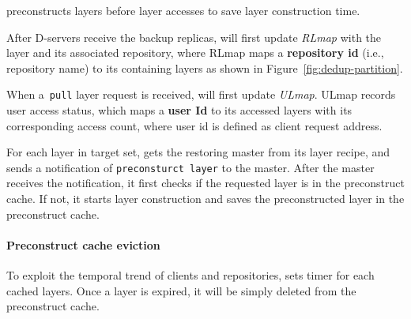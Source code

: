 \sysname preconstructs layers before layer accesses to save layer construction time.

After D-servers receive the backup replicas,
\sysname will first update \emph{RLmap} with the layer and its associated repository, where
RLmap maps a \textbf{repository id} (i.e., repository name) to its containing layers 
as shown in Figure~\ref{fig:dedup-partition}.

When a~\texttt{pull} layer request is received, 
\sysname will first update \emph{ULmap}. 
ULmap records user access status,
which maps a \textbf{user Id} to its accessed layers with its corresponding access count,
where user id is defined as client request address.

For each layer in target set, 
\sysname gets the restoring master from its layer recipe,
and sends a notification of \texttt{preconsturct layer} to the master.
After the master receives the notification,
it first checks if the requested layer is in the preconstruct cache.
If not, 
it starts layer construction and saves the preconstructed layer in the preconstruct cache.
 
%
\paragraph{Preconstruct cache eviction}
To exploit the temporal trend of clients and repositories, 
\sysname sets timer for each cached layers.
Once a layer is expired,
it will be simply deleted from the preconstruct cache.

